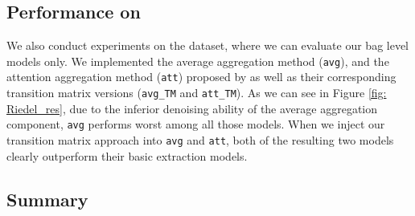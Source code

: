 \subsection{Performance on \EntityRE}
We also conduct experiments on the \EntityRE dataset, where we can evaluate our bag level models only. 
We  implemented the average aggregation method (\texttt{avg}), and the attention aggregation method (\texttt{att}) proposed by \cite{lin2016neural} as well as their corresponding transition matrix versions (\texttt{avg\_TM} and \texttt{att\_TM}). As we can see in Figure \ref{fig: Riedel_res},  due to the inferior denoising ability of the average aggregation component, \texttt{avg} performs worst among all those models. %
When we inject our transition matrix approach into \texttt{avg} and \texttt{att}, both of the resulting two models clearly outperform their basic extraction models.
%

\subsection{Summary}
